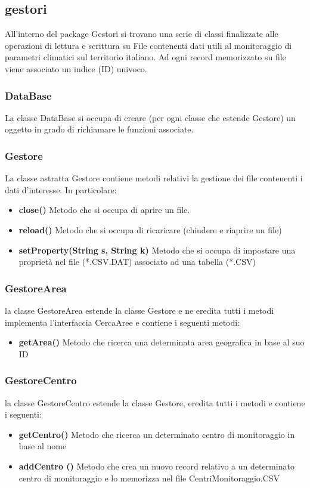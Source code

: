 \documentclass[a4paper, 12pt,twoside]{article}
\begin{document}
		
		
		\subsection{gestori}
		All'interno del package Gestori si trovano una serie di classi finalizzate alle operazioni di lettura e scrittura su File contenenti dati utili al monitoraggio di parametri climatici sul territorio italiano.
		Ad ogni record memorizzato su file viene associato un indice (ID) univoco.	
			\subsubsection{DataBase}
			La classe DataBase si occupa di creare (per ogni classe che estende Gestore) un oggetto in grado di richiamare le funzioni associate.
			\subsubsection{Gestore}
			La classe astratta Gestore contiene metodi relativi la gestione dei file contenenti i dati d'interesse. In particolare:
			\begin{itemize}
				\item \textbf{close()}
				Metodo che si occupa di aprire un file.
				\item \textbf{reload()}
				Metodo che si occupa di ricaricare (chiudere e riaprire un file)
				\item  \textbf{setProperty(String s, String k)}
				Metodo che si occupa di impostare una proprietà nel file (*.CSV.DAT) associato ad una tabella (*.CSV)
			\end{itemize}
			
			
			\subsubsection{GestoreArea}
			la classe GestoreArea estende la classe Gestore e ne eredita tutti i metodi
			implementa l'interfaccia CercaAree e contiene i seguenti metodi:
			\begin{itemize}
				\item \textbf{getArea()}
				Metodo che ricerca una determinata area geografica in base al suo ID
			\end{itemize}
			
			
			
			\subsubsection{GestoreCentro}
			la classe GestoreCentro estende la classe Gestore, eredita tutti i metodi e contiene i seguenti:
			\begin{itemize}
				\item \textbf{getCentro()}
				Metodo che ricerca un determinato centro di monitoraggio in base al nome
				\item \textbf {addCentro ()}
				Metodo che crea un nuovo record relativo a un determinato centro di monitoraggio e lo memorizza nel file CentriMonitoraggio.CSV
			\end{itemize}
			
\end{document}
